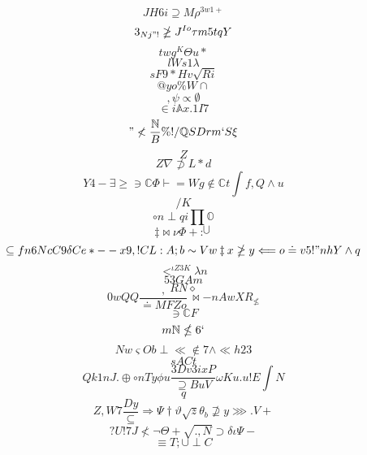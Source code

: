 \documentclass[12pt]{article}
\begin{document}
        \begin{minipage}[t][0pt]{\linewidth}

        \[JH6i\supseteq M\rho^{3w1+}\]
\[3_{Nj"!}\ngeq J^{Io}\tau m 5 t q Y\]
\[twg^{K}\Theta u *\]
\[lWs1\lambda\]
\[sF9*Hv\sqrt{Ri}\]
\[@yo\% W\cap\]
\[,\psi\propto\emptyset\]
\[\in i\mathbb{A} x . 1 I 7\]
\["\nless\frac{\mathbb{N}}{ B}\% ! /\mathbb{Q} S D r m ` S\xi\]
\[Z\]
\[Z\nabla\not\supset L * d\]
\[Y4-\exists\geq\ni\mathbb{C}\Phi\vdash = W g\notin\mathbb{C} t\int f , Q\land u\]
\[/K\]
\[\circ n {\perp q i}\prod\mathbb{O}\]
\[\ddagger\bowtie\nu\Phi + :^{\bigcup}\]
\[\subseteq f n 6 N c C 9\delta C e * - - x 9 , ! C L : A ; b\sim V w\ddagger x\ngeq y\Longleftarrow o\doteq v 5 ! " n h Y\land q\]
\[<^{\iota Z 3 K}\lambda n\]
\[53GAm\]
\[RN\diamond\]
\[0wQQ\frac{,}{\doteq M F Z o}\bowtie - n A w X R_{\nleq}\]
\[\ni\mathbb{C} F\]
\[m\mathbb{N}\nleq 6 `\]
\[Nw\varsigma O b\perp\ll\notin 7\land\ll h 2 3\]
\[sACt\]
\[Qk1nJ.\oplus {\circ n T y}\phi u\frac{3Dv3ixP}{\supseteq B u V}\omega K u . u ! E {\int N}\]
\[q\]
\[Z,W7\frac{Dy}{\subseteq}\Longrightarrow\Psi\dagger\vartheta\sqrt{z}\theta_{b}\nsupseteq y\ggg . V +\]
\[?U!7J\nless\neg\Theta +\sqrt{.,N}\supset {\delta}\iota {\Psi -}\]
\[\equiv T ;\cup\perp C
        \]
\end{minipage}
\end{document}
